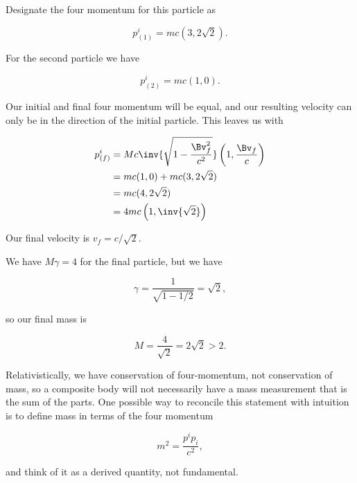 Designate the four momentum for this particle as

\begin{equation}\label{eqn:relElectroDynProblemSet2:70}
p_{(1)}^i = m c ( 3, 2 \sqrt{2} ).
\end{equation}

For the second particle we have

\begin{equation}\label{eqn:relElectroDynProblemSet2:90}
p_{(2)}^i = m c ( 1, 0 ).
\end{equation}

Our initial and final four momentum will be equal, and our resulting velocity can only be in the direction of the initial particle.  This leaves us with

\begin{align*}
p_{(f)}^i
&= M c \inv{\sqrt{1 - \frac{\Bv_f^2}{c^2}}} \left( 1, \frac{\Bv_f}{c} \right) \\
&= m c ( 1, 0 ) + m c ( 3, 2 \sqrt{2} )  \\
&= m c ( 4, 2 \sqrt{2} ) \\
&= 4 m c \left( 1, \inv{\sqrt{2}} \right)
\end{align*}

Our final velocity is $v_f = c/\sqrt{2}$.

We have $M \gamma = 4$ for the final particle, but we have

\begin{equation}\label{eqn:relElectroDynProblemSet2:110}
\gamma = \frac{1}{\sqrt{1 - 1/2}} = \sqrt{2},
\end{equation}

so our final mass is

\begin{equation}\label{eqn:relElectroDynProblemSet2:130}
M = \frac{4}{\sqrt{2}} = 2 \sqrt{2} > 2.
\end{equation}

Relativistically, we have conservation of four-momentum, not conservation of mass, so a composite body will not necessarily have a mass measurement that is the sum of the parts.  One possible way to reconcile this statement with intuition is to define mass in terms of the four momentum

\begin{equation}\label{eqn:relElectroDynProblemSet2:130b}
m^2 = \frac{p^i p_i}{c^2},
\end{equation}

and think of it as a derived quantity, not fundamental.

